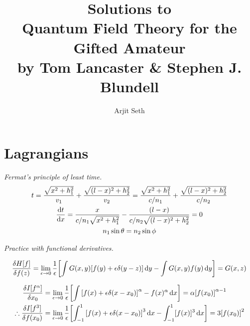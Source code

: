 \documentclass{report}
\begin{document}
\title{Solutions to \\ Quantum Field Theory for the Gifted Amateur \\ by Tom Lancaster \& Stephen J. Blundell}

\author{Arjit Seth}

\maketitle


\chapter{Lagrangians}

\begin{subquests}
	\item \emph{Fermat's principle of least time.}
	\begin{gather*}
		t = \frac{\sqrt{x^2 + h_1^2}}{v_1} + \frac{\sqrt{(l-x)^2+h_2^2}}{v_2} = \frac{\sqrt{x^2 + h_1^2}}{c/n_1} + \frac{\sqrt{(l-x)^2+h_2^2}}{c/n_2} \\
		\dv{t}{x} = \frac{x}{c/n_1\sqrt{x^2 + h_1^2}} - \frac{(l-x)}{c/n_2\sqrt{(l-x)^2 + h_2^2}} = 0 \\
		n_1\sin\theta = n_2\sin\phi
	\end{gather*}
	
	\item \emph{Practice with functional derivatives.}
	\begin{subquests}
		\item
		\begin{gather*}
			\fdv{H[f]}{f(z)} = \lim_{\epsilon \to 0} \frac{1}{\epsilon}\bqty{\int G(x,y)[f(y) + \epsilon\delta(y-z)]\dd{y} - \int G(x,y)f(y)\dd{y}} = G(x,z) \\
	 	\end{gather*}

	 	\item
	 	\begin{align*}
	 		\fdv{I[f^{\alpha}]}{x_0}& =  \lim_{\epsilon \to 0} \frac{1}{\epsilon}\bqty{\int \bqty{f(x) + \epsilon\delta(x - x_0)}^{\alpha} - f(x)^{\alpha} \dd{x}} = \alpha\bqty{f(x_0)}^{\alpha-1}\\ 
	 		\therefore \fdv{I[f^3]}{f(x_0)} & =  \lim_{\epsilon \to 0} \frac{1}{\epsilon}\bqty{\int_{-1}^1 \bqty{f(x) + \epsilon\delta(x-x_0)}^3\dd{x} -\int_{-1}^1 [f(x)]^3 \dd{x}} = 3\bqty{f(x_0)}^2 \\
	 	\end{align*}


\end{subquests}
\end{subquests}
\end{document}
